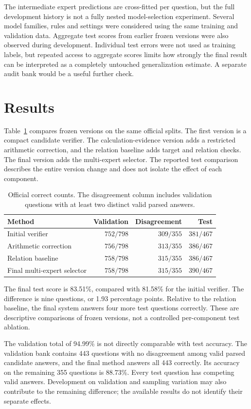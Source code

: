 \documentclass[10pt]{article}
\begin{document}
The intermediate expert predictions are cross-fitted per question, but the full development history is not a fully nested model-selection experiment. Several model families, rules and settings were considered using the same training and validation data. Aggregate test scores from earlier frozen versions were also observed during development. Individual test errors were not used as training labels, but repeated access to aggregate scores limits how strongly the final result can be interpreted as a completely untouched generalization estimate. A separate audit bank would be a useful further check.
\section{Results}
Table~\ref{tab:versions} compares frozen versions on the same official splits. The first version is a compact candidate verifier. The calculation-evidence version adds a restricted arithmetic correction, and the relation baseline adds target and relation checks. The final version adds the multi-expert selector. The reported test comparison describes the entire version change and does not isolate the effect of each component.
\begin{table}[ht]
\centering\small
\begin{tabular}{lrrr}
\toprule
Method & Validation & Disagreement & Test \\
\midrule
Initial verifier & $752/798$ & $309/355$ & $381/467$ \\
Arithmetic correction & $756/798$ & $313/355$ & $386/467$ \\
Relation baseline & $758/798$ & $315/355$ & $386/467$ \\
Final multi-expert selector & $758/798$ & $315/355$ & $390/467$ \\
\bottomrule
\end{tabular}
\caption{Official correct counts. The disagreement column includes validation questions with at least two distinct valid parsed answers.}
\label{tab:versions}
\end{table}

The final test score is 83.51\%, compared with 81.58\% for the initial verifier. The difference is nine questions, or 1.93 percentage points. Relative to the relation baseline, the final system answers four more test questions correctly. These are descriptive comparisons of frozen versions, not a controlled per-component test ablation.

The validation total of 94.99\% is not directly comparable with test accuracy. The validation bank contains 443 questions with no disagreement among valid parsed candidate answers, and the final method answers all 443 correctly. Its accuracy on the remaining 355 questions is 88.73\%. Every test question has competing valid answers. Development on validation and sampling variation may also contribute to the remaining difference; the available results do not identify their separate effects.
\end{document}
